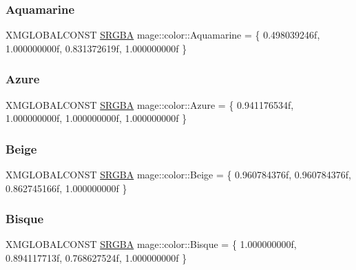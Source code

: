 \subsubsection{\texorpdfstring{Aquamarine}{Aquamarine}}
{\footnotesize\ttfamily X\+M\+G\+L\+O\+B\+A\+L\+C\+O\+N\+ST \hyperlink{structmage_1_1_s_r_g_b_a}{S\+R\+G\+BA} mage\+::color\+::\+Aquamarine = \{ 0.\+498039246f, 1.\+000000000f, 0.\+831372619f, 1.\+000000000f \}}

\hypertarget{namespacemage_1_1color_ab63edad9b98f694796f82171f9312008}{}\label{namespacemage_1_1color_ab63edad9b98f694796f82171f9312008} 
\subsubsection{\texorpdfstring{Azure}{Azure}}
{\footnotesize\ttfamily X\+M\+G\+L\+O\+B\+A\+L\+C\+O\+N\+ST \hyperlink{structmage_1_1_s_r_g_b_a}{S\+R\+G\+BA} mage\+::color\+::\+Azure = \{ 0.\+941176534f, 1.\+000000000f, 1.\+000000000f, 1.\+000000000f \}}

\hypertarget{namespacemage_1_1color_a7f93ba4f8295f50eca69d7212a9d8a3b}{}\label{namespacemage_1_1color_a7f93ba4f8295f50eca69d7212a9d8a3b} 
\subsubsection{\texorpdfstring{Beige}{Beige}}
{\footnotesize\ttfamily X\+M\+G\+L\+O\+B\+A\+L\+C\+O\+N\+ST \hyperlink{structmage_1_1_s_r_g_b_a}{S\+R\+G\+BA} mage\+::color\+::\+Beige = \{ 0.\+960784376f, 0.\+960784376f, 0.\+862745166f, 1.\+000000000f \}}

\hypertarget{namespacemage_1_1color_a397d8ebb40db6a607c30b64ad73572cc}{}\label{namespacemage_1_1color_a397d8ebb40db6a607c30b64ad73572cc} 
\subsubsection{\texorpdfstring{Bisque}{Bisque}}
{\footnotesize\ttfamily X\+M\+G\+L\+O\+B\+A\+L\+C\+O\+N\+ST \hyperlink{structmage_1_1_s_r_g_b_a}{S\+R\+G\+BA} mage\+::color\+::\+Bisque = \{ 1.\+000000000f, 0.\+894117713f, 0.\+768627524f, 1.\+000000000f \}}

\hypertarget{namespacemage_1_1color_a847b3e3bd2697a815deaa417ac74cd87}{}\label{namespacemage_1_1color_a847b3e3bd2697a815deaa417ac74cd87} 
